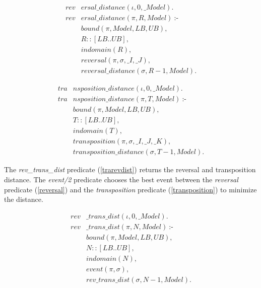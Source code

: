 \begin{align}
  \label{revdistance}
  \textit{rev}&\textit{ersal\_distance}(\iota, 0, \_Model). \nonumber\\
  \textit{rev}&\textit{ersal\_distance}(\pi, R, Model)~\text{:-} \nonumber\\
  &\textit{bound}(\pi, Model, LB, UB), \nonumber\\
  &R :: [LB .. UB], \\
  &\textit{indomain}(R), \nonumber \\
  &\textit{reversal}(\pi, \sigma, \_I, \_J), \nonumber \\
  &\textit{reversal\_distance}(\sigma, R-1, Model). \nonumber
\end{align}

\begin{align}
  \label{tradistance}
  \textit{tra}&\textit{nsposition\_distance}(\iota, 0, \_Model). \nonumber\\
  \textit{tra}&\textit{nsposition\_distance}(\pi, T, Model)~\text{:-} \nonumber\\
  &\textit{bound}(\pi, Model, LB, UB), \nonumber\\
  &T :: [LB .. UB], \\
  &\textit{indomain}(T), \nonumber \\
  &\textit{transposition}(\pi, \sigma, \_I, \_J, \_K), \nonumber \\
  &\textit{transposition\_distance}(\sigma, T-1, Model). \nonumber
\end{align}

The \textit{rev\_trans\_dist} predicate (\ref{trarevdist}) returns the
reversal and transposition distance. The \textit{event/2} predicate
chooses the best event between the \textit{reversal} predicate
(\ref{reversal}) and the \textit{transposition} predicate
(\ref{transposition}) to minimize the distance.

\begin{align}
  \label{trarevdist}
  \textit{rev}&\textit{\_trans\_dist}(\iota, 0, \_Model). \nonumber\\
  \textit{rev}&\textit{\_trans\_dist}(\pi, N, Model)~\text{:-} \nonumber\\
  &\textit{bound}(\pi, Model, LB, UB), \nonumber\\
  &N :: [LB .. UB], \\
  &\textit{indomain}(N), \nonumber \\
  &\textit{event}(\pi, \sigma), \nonumber \\
  &\textit{rev\_trans\_dist}(\sigma, N-1, Model). \nonumber
\end{align}

